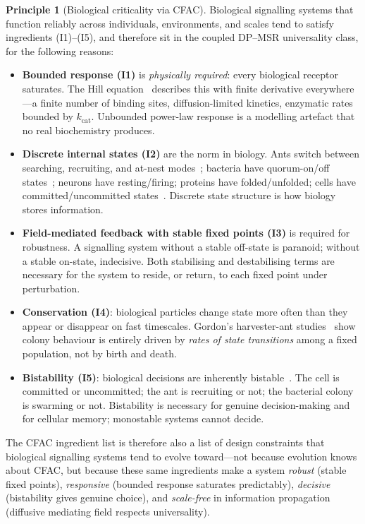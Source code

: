 \documentclass[10pt,a4paper,twocolumn]{article}
\theoremstyle{definition}
\newtheorem*{principle}{Principle}
\begin{document}
\begin{principle}[Biological criticality via CFAC]
\label{prin:bio-crit}
Biological signalling systems that function reliably across
individuals, environments, and scales tend to satisfy
ingredients (I1)--(I5), and therefore sit in the coupled DP--MSR
universality class, for the following reasons:
\begin{itemize}
  \item \textbf{Bounded response (I1)} is \emph{physically required}:
    every biological receptor saturates.  The Hill
    equation~\citep{Hill1913} describes this with finite
    derivative everywhere---a finite number of binding sites,
    diffusion-limited kinetics, enzymatic rates bounded by
    $k_{\text{cat}}$.  Unbounded power-law response is a
    modelling artefact that no real biochemistry produces.
  \item \textbf{Discrete internal states (I2)} are the norm in biology.
    Ants switch between searching, recruiting, and at-nest
    modes~\citep{Sumpter2010,Gordon2010}; bacteria have
    quorum-on/off states~\citep{BasslerLosick2006}; neurons have
    resting/firing; proteins have folded/unfolded; cells have
    committed/uncommitted states~\citep{FerrellXiong2001}.
    Discrete state structure is how biology stores information.
  \item \textbf{Field-mediated feedback with stable fixed points (I3)}
    is required for robustness.  A signalling system without a
    stable off-state is paranoid; without a stable on-state,
    indecisive.  Both stabilising and destabilising terms are
    necessary for the system to reside, or return, to each fixed
    point under perturbation.
  \item \textbf{Conservation (I4)}: biological particles change
    state more often than they appear or disappear on fast
    timescales.  Gordon's harvester-ant studies~\citep{Gordon2010}
    show colony behaviour is entirely driven by \emph{rates of
    state transitions} among a fixed population, not by birth
    and death.
  \item \textbf{Bistability (I5)}: biological decisions are
    inherently bistable~\citep{FerrellXiong2001,Tyson2003}.  The
    cell is committed or uncommitted; the ant is recruiting or
    not; the bacterial colony is swarming or not.  Bistability
    is necessary for genuine decision-making and for cellular
    memory; monostable systems cannot decide.
\end{itemize}
The CFAC ingredient list is therefore also a list of design
constraints that biological signalling systems tend to evolve
toward---not because evolution knows about CFAC, but because
these same ingredients make a system \emph{robust}
(stable fixed points), \emph{responsive} (bounded response
saturates predictably), \emph{decisive} (bistability gives
genuine choice), and \emph{scale-free} in information
propagation (diffusive mediating field respects universality).
\end{principle}
\end{document}
